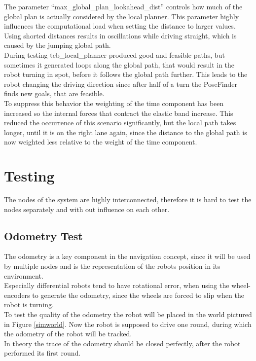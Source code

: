 The parameter ``max\_global\_plan\_lookahead\_dist'' controls how much of the global plan is actually considered by the local planner. This parameter highly influences the computational load when setting the distance to larger values. Using shorted distances results in oscillations while driving straight, which is caused by the jumping global path.\\

During testing teb\_local\_planner produced good and feasible paths, but sometimes it generated loops along the global path, that would result in the robot turning in spot, before it follows the global path further. This leads to the robot changing the driving direction since after half of a turn the PoseFinder finds new goals, that are feasible.\\

To suppress this behavior the weighting of the time component has been increased so the internal forces that contract the elastic band increase. This reduced the occurrence of this scenario significantly, but the local path takes longer, until it is on the right lane again, since the distance to the global path is now weighted less relative to the weight of the time component.
\section{Testing}
The nodes of the system are highly interconnected, therefore it is hard to test the nodes separately and with out influence on each other.
\subsection{Odometry Test}
The odometry is a key component in the navigation concept, since it will be used by multiple nodes and is the representation of the robots position in its environment.\\

Especially differential robots tend to have rotational error, when using the wheel-encoders to generate the odometry, since the wheels are forced to slip when the robot is turning.\\

To test the quality of the odometry the robot will be placed in the world pictured in Figure \ref{simworld}. Now the robot is supposed to drive one round, during which the odometry of the robot will be tracked.\\

In theory the trace of the odometry should be closed perfectly, after the robot performed its first round.\\

